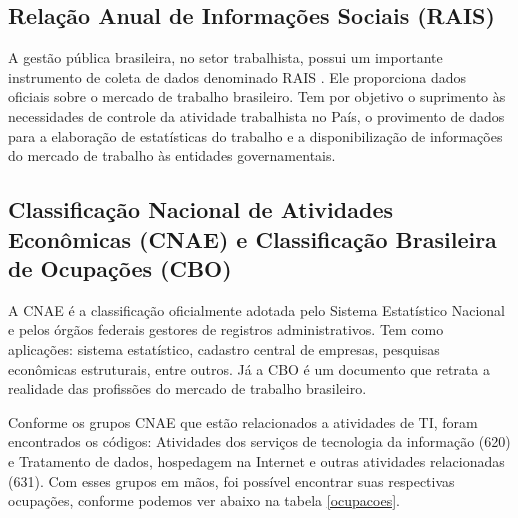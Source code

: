 \subsection{Relação Anual de Informações Sociais (RAIS)}

A gestão pública brasileira, no setor trabalhista, possui um importante instrumento de coleta de dados denominado RAIS \cite{Sobre_a_RAIS}. Ele proporciona dados oficiais sobre o mercado de trabalho brasileiro. Tem por objetivo o suprimento às necessidades de controle da atividade trabalhista no País, o provimento de dados para a elaboração de estatísticas do trabalho e a disponibilização de informações do mercado de trabalho às entidades governamentais.

\subsection{Classificação Nacional de Atividades Econômicas (CNAE) e Classificação Brasileira de Ocupações (CBO)}

A CNAE \cite{Sobre_a_CNAE} é a classificação oficialmente adotada pelo Sistema Estatístico Nacional e pelos órgãos federais gestores de registros administrativos. Tem como aplicações: sistema estatístico, cadastro central de empresas, pesquisas econômicas estruturais, entre outros. Já a CBO \cite{Sobre_a_CBO} é um documento que retrata a realidade das profissões do mercado de trabalho brasileiro. 

Conforme os grupos CNAE que estão relacionados a atividades de TI, foram encontrados os códigos: Atividades dos serviços de tecnologia da informação (620) e Tratamento de dados, hospedagem na Internet e outras atividades relacionadas (631). Com esses grupos em mãos, foi possível encontrar suas respectivas ocupações, conforme podemos ver abaixo na tabela \ref{ocupacoes}.

